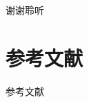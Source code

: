 \documentclass[aspectratio=169,AutoFakeBold]{beamer}
\begin{document}
\begin{frame}
    \Background
    \begin{center}
        {\Huge\calligra 谢谢聆听}
    \end{center}
\end{frame}

\section{参考文献}

\begin{frame}[allowframebreaks]{参考文献}
    
\end{frame}
\end{document}
